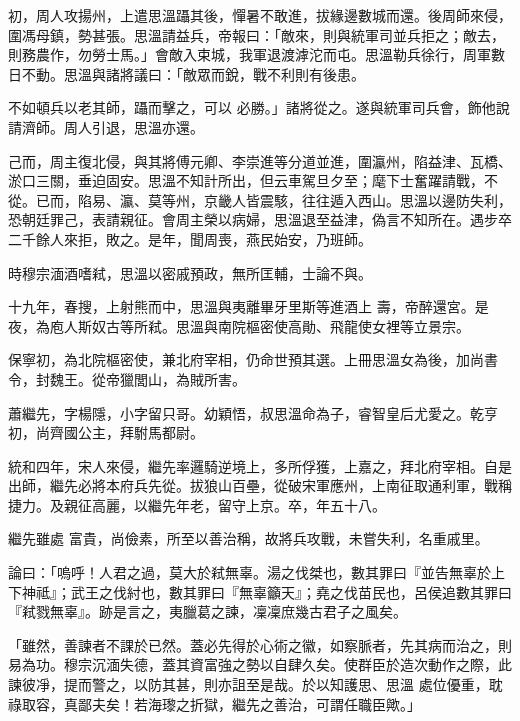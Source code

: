\begin{pinyinscope}
 初，周人攻揚州，上遣思溫躡其後，憚暑不敢進，拔緣邊數城而還。後周師來侵，圍馮母鎮，勢甚張。思溫請益兵，帝報曰：「敵來，則與統軍司並兵拒之；敵去，則務農作，勿勞士馬。」會敵入束城，我軍退渡滹沱而屯。思溫勒兵徐行，周軍數日不動。思溫與諸將議曰：「敵眾而銳，戰不利則有後患。



 不如頓兵以老其師，躡而擊之，可以
 必勝。」諸將從之。遂與統軍司兵會，飾他說請濟師。周人引退，思溫亦還。



 己而，周主復北侵，與其將傅元卿、李崇進等分道並進，圍瀛州，陷益津、瓦橋、淤口三關，垂迫固安。思溫不知計所出，但云車駕旦夕至；麾下士奮躍請戰，不從。已而，陷易、瀛、莫等州，京畿人皆震駭，往往遁入西山。思溫以邊防失利，恐朝廷罪己，表請親征。會周主榮以病婦，思溫退至益津，偽言不知所在。遇步卒二千餘人來拒，敗之。是年，聞周喪，燕民始安，乃班師。



 時穆宗湎酒嗜弒，思溫以密戚預政，無所匡輔，士論不與。



 十九年，春搜，上射熊而中，思溫與夷離畢牙里斯等進酒上
 壽，帝醉還宮。是夜，為庖人斯奴古等所弒。思溫與南院樞密使高勛、飛龍使女裡等立景宗。



 保寧初，為北院樞密使，兼北府宰相，仍命世預其選。上冊思溫女為後，加尚書令，封魏王。從帝獵閭山，為賊所害。



 蕭繼先，字楊隱，小字留只哥。幼穎悟，叔思溫命為子，睿智皇后尤愛之。乾亨初，尚齊國公主，拜駙馬都尉。



 統和四年，宋人來侵，繼先率邏騎逆境上，多所俘獲，上嘉之，拜北府宰相。自是出師，繼先必將本府兵先從。拔狼山百壘，從破宋軍應州，上南征取通利軍，戰稱捷力。及親征高麗，以繼先年老，留守上京。卒，年五十八。



 繼先雖處
 富貴，尚儉素，所至以善治稱，故將兵攻戰，未嘗失利，名重戚里。



 論曰：「嗚呼！人君之過，莫大於弒無辜。湯之伐桀也，數其罪曰『並告無辜於上下神祗』；武王之伐紂也，數其罪曰『無辜籲天』；堯之伐苗民也，呂侯追數其罪曰『弒戮無辜』。跡是言之，夷臘葛之諫，凜凜庶幾古君子之風矣。



 「雖然，善諫者不課於已然。蓋必先得於心術之徽，如察脈者，先其病而治之，則易為功。穆宗沉湎失德，蓋其資富強之勢以自肆久矣。使群臣於造次動作之際，此諫彼凈，提而警之，以防其甚，則亦詛至是哉。於以知護思、思溫
 處位優重，耽祿取容，真鄙夫矣！若海瓈之折獄，繼先之善治，可謂任職臣歟。」



\end{pinyinscope}